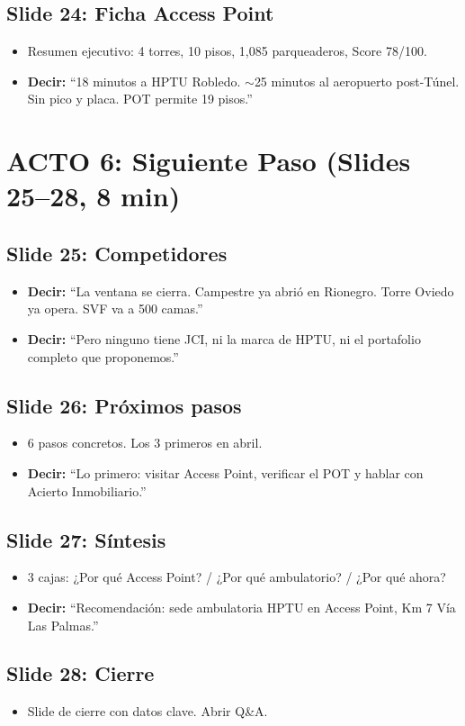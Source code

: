 \documentclass[11pt, a4paper]{article}
\newcommand{\slide}[2]{\subsection{Slide #1: #2}}
\newcommand{\say}[1]{\textcolor{hptu}{\textbf{Decir:}} ``#1''}
\begin{document}
\slide{24}{Ficha Access Point}
\begin{itemize}[leftmargin=1cm]
  \item Resumen ejecutivo: 4 torres, 10 pisos, 1,085 parqueaderos, Score 78/100.
  \item \say{18 minutos a HPTU Robledo. $\sim$25 minutos al aeropuerto post-Túnel. Sin pico y placa. POT permite 19 pisos.}
\end{itemize}

\section{ACTO 6: Siguiente Paso (Slides 25--28, 8 min)}

\slide{25}{Competidores}
\begin{itemize}[leftmargin=1cm]
  \item \say{La ventana se cierra. Campestre ya abrió en Rionegro. Torre Oviedo ya opera. SVF va a 500 camas.}
  \item \say{Pero ninguno tiene JCI, ni la marca de HPTU, ni el portafolio completo que proponemos.}
\end{itemize}

\slide{26}{Próximos pasos}
\begin{itemize}[leftmargin=1cm]
  \item 6 pasos concretos. Los 3 primeros en abril.
  \item \say{Lo primero: visitar Access Point, verificar el POT y hablar con Acierto Inmobiliario.}
\end{itemize}

\slide{27}{Síntesis}
\begin{itemize}[leftmargin=1cm]
  \item 3 cajas: ¿Por qué Access Point? / ¿Por qué ambulatorio? / ¿Por qué ahora?
  \item \say{Recomendación: sede ambulatoria HPTU en Access Point, Km 7 Vía Las Palmas.}
\end{itemize}

\slide{28}{Cierre}
\begin{itemize}[leftmargin=1cm]
  \item Slide de cierre con datos clave. Abrir Q\&A.
\end{itemize}
\end{document}
